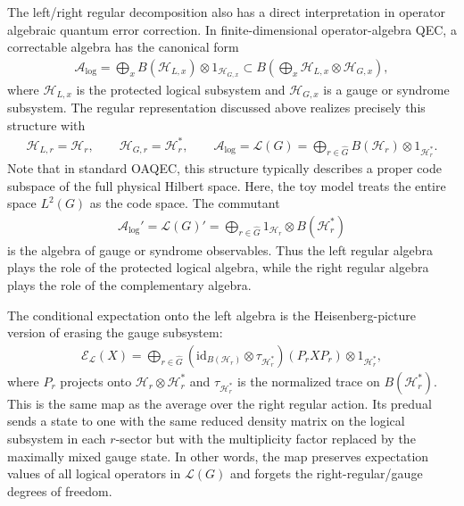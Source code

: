 \documentclass[11pt]{article}
\newcommand{\mA}{\mathcal{A}}
\newcommand{\mE}{\mathcal{E}}
\newcommand{\mH}{\mathcal{H}}
\begin{document}
The left/right regular decomposition also has a direct interpretation in
operator algebraic quantum error correction. In finite-dimensional
operator-algebra QEC, a correctable algebra has the canonical form
\begin{align}
    \mA_{\mathrm{log}}
    =\bigoplus_x B(\mH_{L,x})\otimes 1_{\mH_{G,x}}
    \subset
    B\left(\bigoplus_x \mH_{L,x}\otimes \mH_{G,x}\right),
\end{align}
where $\mH_{L,x}$ is the protected logical subsystem and $\mH_{G,x}$ is a
gauge or syndrome subsystem. The regular representation discussed above realizes precisely this structure with
\begin{align}
    \mH_{L,r}=\mH_r,\qquad
    \mH_{G,r}=\mH_r^*,\qquad
    \mA_{\mathrm{log}}=\mathcal L(G)
    =\bigoplus_{r\in\hat G}B(\mH_r)\otimes 1_{\mH_r^*}.
\end{align}
Note that in standard OAQEC, this structure typically describes a proper code subspace of the full physical Hilbert space. Here, the toy model treats the entire space $L^2(G)$ as the code space.
The commutant
\begin{align}
    \mA_{\mathrm{log}}'
    =\mathcal L(G)'
    =\bigoplus_{r\in\hat G}1_{\mH_r}\otimes B(\mH_r^*)
\end{align}
is the algebra of gauge or syndrome observables. Thus the left regular algebra
plays the role of the protected logical algebra, while the right regular algebra
plays the role of the complementary algebra.

The conditional expectation onto the left algebra is the Heisenberg-picture
version of erasing the gauge subsystem:
\begin{align}
    \mE_{\mathcal L}(X)
    =
    \bigoplus_{r\in\hat G}
    \left(\mathrm{id}_{B(\mH_r)}\otimes \tau_{\mH_r^*}\right)
    (P_r X P_r)\otimes 1_{\mH_r^*},
\end{align}
where $P_r$ projects onto $\mH_r\otimes\mH_r^*$ and
$\tau_{\mH_r^*}$ is the normalized trace on $B(\mH_r^*)$. This is the same map
as the average over the right regular action. Its predual sends a state to one
with the same reduced density matrix on the logical subsystem in each $r$-sector but with the multiplicity
factor replaced by the maximally mixed gauge state. In other words, the map
preserves expectation values of all logical operators in $\mathcal L(G)$ and
forgets the right-regular/gauge degrees of freedom.
\end{document}
